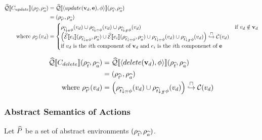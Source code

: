 \begin{align}
    \abssqlsem{C_{update}}(\env{\abstable}, \env{\absvars})
                                              & = \abssqlsem{\langle update(\absattrs, \absexps), \abspred \rangle} (\env{\abstable}, \env{\absvars}) \\
                                              & = (\env{\abstable'}, \env{\absvars})                                                                 \\
    \text{where } \env{\abstable'}(\absattr) & =
    \begin{cases}
        \env{\abstable \downarrow_{\true} \abspred}(\absattr) \cup \env{\abstable \downarrow_{\unknown} \abspred}(\absattr) \cup \env{\abstable \downarrow_{\false} \abspred}(\absattr) & \text{if } \absattr \notin \absattrs \\
        \left( \absexpsem{\absexp{i}}(\env{\abstable \downarrow_{\true} \abspred}, \env{\absvars}) \cup
        \absexpsem{\absexp{i}}(\env{\abstable \downarrow_{\unknown} \abspred}, \env{\absvars}) \cup \env{\abstable \downarrow_{\unknown} \abspred}(\absattr) \cup \env{\abstable \downarrow_{\false} \abspred}(\absattr) \right) \into \lookupcl(v_{d})\\
        \text{if $\absattr$ is the $i$th component of $\absattrs$ and $\absexp{i}$ is the $i$th componenet of $\absexps$} \\
    \end{cases}
\end{align}

\begin{align*}
    \widehat{\mathcal{Q}}\llbracket C_{delete} \rrbracket(\rho_{\widehat{t}}, \rho_{\widehat{a}})
    &= \widehat{\mathcal{Q}}\llbracket \langle delete(\mathbf{v}_d), \phi \rangle \rrbracket (\rho_{\widehat{t}}, \rho_{\widehat{a}}) \\
    &= (\rho_{\widehat{t}'}, \rho_{\widehat{a}}) \\
    \text{where } \rho_{\widehat{t}'}(v_d) &= \left( \rho_{\widehat{t} \downarrow_{?\!?} \phi}(v_d) \cup \rho_{\widehat{t} \downarrow_{f\!\!f} \phi}(v_d) \right) \overset{\sqcap}{\hookrightarrow} \mathcal{C}(v_d)
\end{align*}

\subsubsection{Abstract Semantics of Actions}

Let $\widehat{P}$ be a set of abstract environments $(\rho_{\widehat{t}}, \rho_{\widehat{a}})$.

